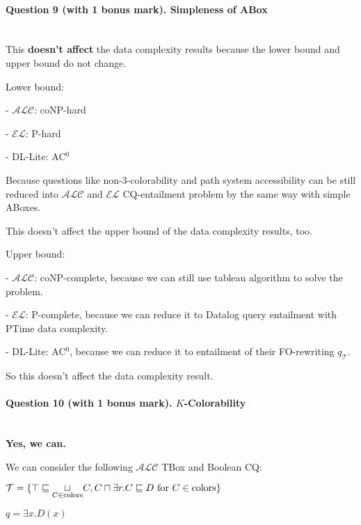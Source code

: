 \documentclass[12pt]{article}
\begin{document}
    \newpage
    \paragraph{Question 9 (with 1 bonus mark). Simpleness of ABox}~{}
    \\

    This \textbf{ doesn't affect }the data complexity results because the lower bound and upper bound do not change. 

    Lower bound:

    - $\mathcal{ALC}$: coNP-hard \par
    - $\mathcal{EL}$: P-hard \par
    - $\text{DL-Lite}$: AC$^0$ \par

    Because questions like non-3-colorability and path system accessibility can be still reduced into $\mathcal{ALC}$ and $\mathcal{EL}$ CQ-entailment problem by the same way with simple ABoxes.

    This doesn't affect the upper bound of the data complexity results, too.

    Upper bound:

    - $\mathcal{ALC}$: coNP-complete, because we can still use tableau algorithm to solve the problem. \par
    - $\mathcal{EL}$: P-complete, because we can reduce it to Datalog query entailment with PTime data complexity. \par
    - $\text{DL-Lite}$: AC$^0$, because we can reduce it to entailment of their FO-rewriting $q_{\mathcal{T}}$. \par

    So this doesn't affect the data complexity result.

    \newpage
    \paragraph{Question 10 (with 1 bonus mark). $K$-Colorability}~{}
    \\

    \textbf{Yes, we can. } \par

    We can consider the following $\mathcal{ALC}$ TBox and Boolean CQ:

    $\mathcal{T} = \{ \top \sqsubseteq \underset{C \in \text{colors}}{\Large\sqcup}C, C \sqcap \exists r.C \sqsubseteq D \text{ for } C \in \text{colors} \}$

    $q = \exists x.D(x)$
\end{document}
